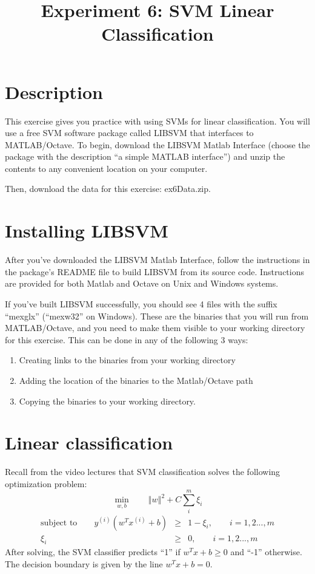 \documentclass[10pt,a4paper]{article}
\begin{document}
\title{Experiment 6: SVM Linear Classification}

\maketitle
  
\section{Description}
%
  This exercise gives you practice with using SVMs for linear classification. You will use a free SVM software package called LIBSVM that interfaces to MATLAB/Octave. To begin, download the LIBSVM Matlab Interface (choose the package with the description ``a simple MATLAB interface'') and unzip the contents to any convenient location on your computer.

  Then, download the data for this exercise: ex6Data.zip.


\section{Installing LIBSVM}
%
  After you've downloaded the LIBSVM Matlab Interface, follow the instructions in the package's README file to build LIBSVM from its source code. Instructions are provided for both Matlab and Octave on Unix and Windows systems.

  If you've built LIBSVM successfully, you should see 4 files with the suffix ``mexglx'' (``mexw32'' on Windows). These are the binaries that you will run from MATLAB/Octave, and you need to make them visible to your working directory for this exercise. This can be done in any of the following 3 ways:
  \begin{enumerate}
    \item Creating links to the binaries from your working directory
    \item Adding the location of the binaries to the Matlab/Octave path
    \item Copying the binaries to your working directory.
  \end{enumerate}




\section{Linear classification}
%
  Recall from the video lectures that SVM classification solves the following optimization problem:
  \begin{displaymath}
    \min_{w,b}\qquad\left\Vert w\right\Vert ^{2}+C\sum_{i}^{m}\xi_{i}
  \end{displaymath}
  \begin{eqnarray*}
    \mbox{subject to}\qquad y^{(i)}(w^{T}x^{(i)}+b) & \geq & 1-\xi_{i},\qquad i=1,2...,m\\
    \xi_{i} & \geq & 0,\qquad i=1,2...,m
  \end{eqnarray*}
  After solving, the SVM classifier predicts ``1'' if  $w^T x + b \geq 0$ and ``-1'' otherwise. The decision boundary is given by the line $w^T x + b = 0$.
\end{document}
